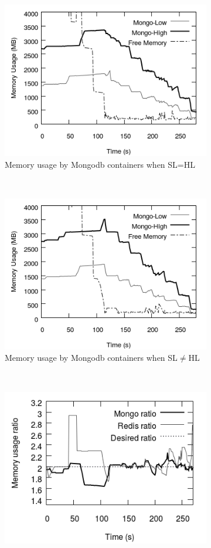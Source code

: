 \begin{figure}
	\begin{subfigure}{0.30\textwidth}
	  \includegraphics[scale=0.4]{images/mem_sol/sl=hl_mtp/memory_usage.png}
	  \caption{\footnotesize Memory usage by Mongodb containers when SL=HL}
	  \label{mem_sol_sl=hl_mongo}
	\end{subfigure}
	~
	\begin{subfigure}{0.30\textwidth}
	  \includegraphics[scale=0.4]{images/mem_sol/sl!=hl_mtp/memory_usage.png}
	  \caption{\footnotesize Memory usage by Mongodb containers when SL$\neq$HL}
	  \label{mem_sol_sl!=hl_mongo}
	\end{subfigure}	
	~
	\begin{subfigure}{0.30\textwidth}
	  \includegraphics[scale=0.4]{images/mem_sol/memory_ratio_base.png}

\end{subfigure}
\end{figure}
